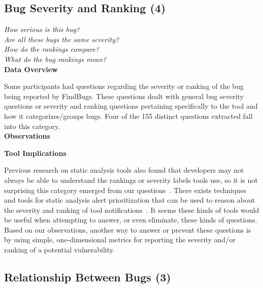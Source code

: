 \documentclass[conference]{IEEEtran}
\begin{document}

\noindent\subsection{\textbf{Bug Severity and Ranking (4)}}\label{bsr}

\noindent\emph{How serious is this bug?} \\
\emph{Are all these bugs the same severity?} \\
\emph{How do the rankings compare?} \\
\emph{What do the bug rankings mean?} \\


\noindent\textbf{Data Overview}

Some participants had questions regarding the severity or ranking of the bug being reported by FindBugs. 
These questions dealt with general bug severity questions or severity and ranking questions pertaining specifically to the tool and how it categorizes/groups bugs. 
Four of the 155 distinct questions extracted fall into this category. 
\\

\noindent\textbf{Observations}


\noindent\textbf{Tool Implications}

Previous research on static analysis tools also found that developers may not always be able to understand the rankings or severity labels tools use, so it is not surprising this category emerged from our questions~\cite{johnson2013don}.
There exists techniques and tools for static analysis alert prioritization that can be used to reason about the severity and ranking of tool notifications~\cite{kim2007prioritizing, boogerd2006prioritizing, kremenek2004correlation}.
It seems these kinds of tools would be useful when attempting to answer, or even eliminate, these kinds of questions. 
Based on our observations, another way to answer or prevent these questions is by using simple, one-dimensional metrics for reporting the severity and/or ranking of a potential vulnerability.



\noindent\subsection{\textbf{Relationship Between Bugs (3)}}\label{rbb}
\end{document}
